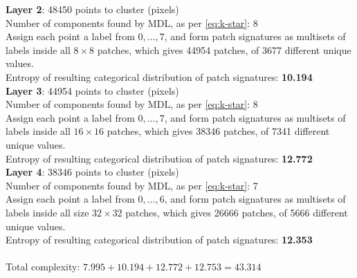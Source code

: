 \documentclass[a4paper,fleqn]{cas-sc}
\theoremstyle{remark}
\begin{document}
\noindent  \textbf{Layer 2}: 48450 points to cluster (pixels)  \\
Number of components found by MDL, as per \eqref{eq:k-star}: 8 \\
Assign each point a label from $0, \dots, 7$, and form patch signatures as multisets of labels inside all $8 \times 8$ patches, which gives 44954 patches, of 3677 different unique values. \\
Entropy of resulting categorical distribution of patch signatures: \textbf{10.194} \\

\noindent  \textbf{Layer 3}: 44954 points to cluster (pixels)  \\
Number of components found by MDL, as per \eqref{eq:k-star}: 8 \\
Assign each point a label from $0, \dots, 7$, and form patch signatures as multisets of labels inside all $16 \times 16$ patches, which gives 38346 patches, of 7341 different unique values. \\
Entropy of resulting categorical distribution of patch signatures: \textbf{12.772} \\

\noindent  \textbf{Layer 4}: 38346 points to cluster (pixels)  \\
Number of components found by MDL, as per \eqref{eq:k-star}: 7 \\
Assign each point a label from $0, \dots, 6$, and form patch signatures as multisets of labels inside all size $32 \times 32$ patches, which gives 26666 patches, of 5666 different unique values. \\
Entropy of resulting categorical distribution of patch signatures: \textbf{12.353} \\
\\
Total complexity: $7.995 + 10.194 + 12.772 + 12.753 = \boldsymbol{43.314}$
\\
\end{document}
